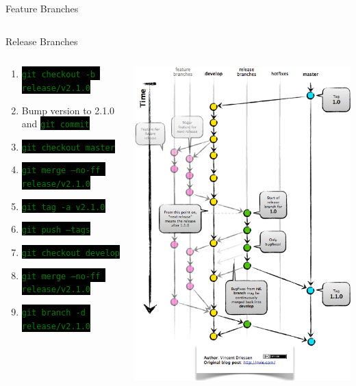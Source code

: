 \documentclass[
14pt,
aspectratio=169,
usenames,
dvipsnames,
x11names]{beamer}
\newcommand{\code}[1]{{\small\colorbox{black}{\textcolor{green}{\texttt{#1}}}}}
\begin{document}
\begin{frame}{Feature Branches}
\begin{columns}
\begin{column}{.35\linewidth}
    \end{column}
  \end{columns}
\end{frame}

\begin{frame}{Release Branches}
  \begin{columns}
    \begin{column}{.62\linewidth}
      \minipage[c][0.75\textheight][s]{\columnwidth}
      \begin{enumerate} \setlength{\itemsep}{\fill}
      \item \code{git checkout -b release/v2.1.0}
      \item Bump version to 2.1.0 and \code{git commit}
      \item \code{git checkout master}
      \item \code{git merge --no-ff release/v2.1.0}
      \item \code{git tag -a v2.1.0}
      \item \code{git push --tags}
      \item \code{git checkout develop}
      \item \code{git merge --no-ff release/v2.1.0}
      \item \code{git branch -d release/v2.1.0}
      \end{enumerate}
      \endminipage
    \end{column}
    \begin{column}{.38\linewidth}
      \centering
      \includegraphics[width=.7\textwidth,clip,trim=5.5cm 5cm 0 0]{release-branches}
    \end{column}
  \end{columns}
\end{frame}
\end{document}
